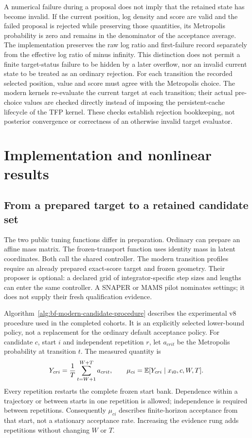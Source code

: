 A numerical failure during a proposal does not imply that the retained state
has become invalid. If the current position, log density and score are valid
and the failed proposal is rejected while preserving those quantities, its
Metropolis probability is zero and remains in the denominator of
the acceptance average. The implementation preserves the raw log ratio
and first-failure record separately from the effective log ratio of minus
infinity. This distinction does not permit a finite target-status failure to
be hidden by a later overflow, nor an invalid current state to be treated as
an ordinary rejection. For each transition the recorded selected position,
value and score must agree with the Metropolis choice. The modern kernels
re-evaluate the current target at each transition; their actual pre-choice
values are checked directly instead of imposing the persistent-cache lifecycle
of the TFP kernel. These checks establish rejection bookkeeping, not posterior
convergence or correctness of an otherwise invalid target evaluator.

\section{Implementation and nonlinear results}
\label{sec:bf-modern-local-results}

\subsection{From a prepared target to a retained candidate set}

The two public tuning functions differ in preparation. Ordinary
 can prepare an affine mass matrix.
The frozen-transport function 
uses identity mass in latent coordinates. Both call the shared controller.
The modern transition profiles require an already prepared exact-score target
and frozen geometry. Their proposer is optional: a declared grid of
integrator-specific step sizes and lengths can enter the same controller.
A SNAPER or MAMS pilot nominates settings; it does not supply their fresh
qualification evidence.

Algorithm~\ref{alg:bf-modern-candidate-procedure} describes the experimental
v8 procedure used in the completed cohorts. It is an explicitly selected
lower-bound policy, not a replacement for the ordinary default acceptance
policy. For candidate $c$, start $i$ and independent repetition $r$, let
$a_{crit}$ be the Metropolis probability at transition $t$. The measured
quantity is
\begin{equation}
 Y_{cri}=\frac1T\sum_{t=W+1}^{W+T}a_{crit},\qquad
 \mu_{ci}=\mathbb{E}[Y_{cri}\mid x_{i0},c,W,T].
 \label{eq:bf-modern-trial-mean}
\end{equation}
Every repetition restarts the complete frozen start bank. Dependence within
a trajectory or between starts in one repetition is allowed; independence
is required between repetitions. Consequently $\mu_{ci}$ describes
finite-horizon acceptance from that start, not a stationary acceptance rate.
Increasing the evidence rung adds repetitions without changing $W$ or $T$.

